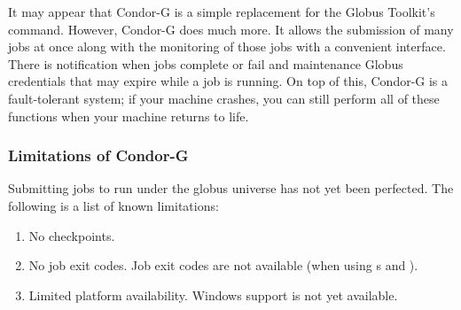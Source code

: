 
It may appear that Condor-G is a simple replacement
for the Globus Toolkit's  command.
However, Condor-G does much more.
It allows the submission of many jobs at once
along with the monitoring of those jobs with a convenient interface.
There is notification when jobs complete or fail
and maintenance Globus credentials
that may expire while a job is running.
On top of this, Condor-G is a fault-tolerant system;
if your machine crashes,
you can still perform all of these functions when your machine returns to life.










\subsubsection{\label{sec:Condor-G-Limits}Limitations of Condor-G}
Submitting jobs to run under the globus universe has not yet
been perfected.
The following is a list of known limitations:

\begin{enumerate}
\item{No checkpoints.}
\item{No job exit codes.}
Job exit codes are not available (when using s
 and ).
\item{Limited platform availability.}
Windows support is not yet available.
\end{enumerate}



